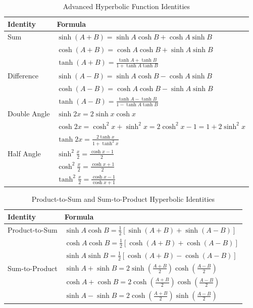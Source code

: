 \begin{table}[h]
\centering
\begin{tabular}{@{}ll@{}}
\toprule
Identity & Formula \\
\midrule
Sum & $\sinh(A + B) = \sinh A \cosh B + \cosh A \sinh B$ \\
 & $\cosh(A + B) = \cosh A \cosh B + \sinh A \sinh B$ \\
 & $\tanh(A + B) = \frac{\tanh A + \tanh B}{1 + \tanh A \tanh B}$ \\
\midrule
Difference & $\sinh(A - B) = \sinh A \cosh B - \cosh A \sinh B$ \\
 & $\cosh(A - B) = \cosh A \cosh B - \sinh A \sinh B$ \\
 & $\tanh(A - B) = \frac{\tanh A - \tanh B}{1 - \tanh A \tanh B}$ \\
\midrule
Double Angle & $\sinh 2x = 2\sinh x \cosh x$ \\
 & $\cosh 2x = \cosh^2 x + \sinh^2 x = 2\cosh^2 x - 1 = 1 + 2\sinh^2 x$ \\
 & $\tanh 2x = \frac{2\tanh x}{1 + \tanh^2 x}$ \\
\midrule
Half Angle & $\sinh^2 \frac{x}{2} = \frac{\cosh x - 1}{2}$ \\
 & $\cosh^2 \frac{x}{2} = \frac{\cosh x + 1}{2}$ \\
 & $\tanh^2 \frac{x}{2} = \frac{\cosh x - 1}{\cosh x + 1}$ \\
\bottomrule
\end{tabular}
\caption{Advanced Hyperbolic Function Identities}
\label{tab:advanced_hyperbolic_identities}
\end{table}

\begin{table}[h]
\centering
\begin{tabular}{@{}ll@{}}
\toprule
Identity & Formula \\
\midrule
Product-to-Sum & $\sinh A \cosh B = \frac{1}{2}[\sinh(A + B) + \sinh(A - B)]$ \\
 & $\cosh A \cosh B = \frac{1}{2}[\cosh(A + B) + \cosh(A - B)]$ \\
 & $\sinh A \sinh B = \frac{1}{2}[\cosh(A + B) - \cosh(A - B)]$ \\
\midrule
Sum-to-Product & $\sinh A + \sinh B = 2 \sinh(\frac{A + B}{2}) \cosh(\frac{A - B}{2})$ \\
 & $\cosh A + \cosh B = 2 \cosh(\frac{A + B}{2}) \cosh(\frac{A - B}{2})$ \\
 & $\sinh A - \sinh B = 2 \cosh(\frac{A + B}{2}) \sinh(\frac{A - B}{2})$ \\
\bottomrule
\end{tabular}
\caption{Product-to-Sum and Sum-to-Product Hyperbolic Identities}
\label{tab:product_sum_hyperbolic_identities}
\end{table}